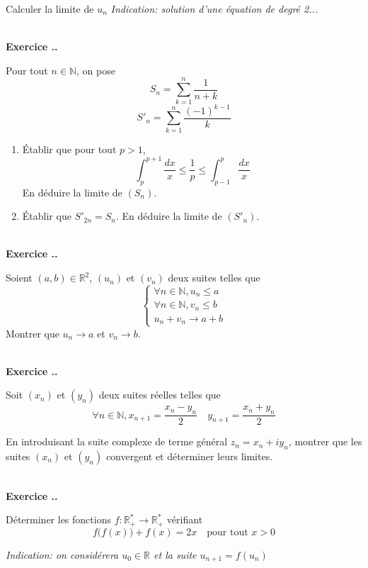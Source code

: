 \documentclass{article}
\newcommand{\mb}[1]{\mathbb{#1}}
\newcounter{exo}
\newcommand{\exercice}[1][\null]{\textbf{\\ Exercice \thesection.\theexo. #1} \addtocounter{exo}{1}}
\begin{document}
Calculer la limite de $u_n$ \emph{Indication: solution d'une équation de degré
2...}

\exercice

Pour tout $n \in \mb{N}$, on pose
\begin{equation*}
    S_{n} = \sum_{k = 1}^{n} \frac{1}{n + k}
\end{equation*}
\begin{equation*}
    S'_{n} = \sum_{k = 1}^{n} \frac{( - 1)^{k - 1}}{k}
\end{equation*}
\begin{enumerate}
    \item
    Établir que pour tout $p > 1$,
    \begin{equation*}
        \int_{p}^{p + 1} \frac{d x}{x} \leq \frac{1}{p} \leq \int_{p - 1}^{p} \frac{d x}{x}
    \end{equation*}
    En déduire la limite de $(S_{n})$.
    \item
    Établir que $S'_{2n} = S_{n}$. En déduire la limite de $(S'_{n})$.
\end{enumerate}


\exercice

Soient $(a,b) \in \mb{R}^{2}$, $(u_{n})$ et $(v_{n})$ deux suites telles que
\begin{equation*}
    \begin{cases}
        \forall n \in \mb{N}, u_n \leq a \\
        \forall n \in \mb{N}, v_n \leq b \\
        u_n + v_n \to a + b
    \end{cases}
\end{equation*}
Montrer que $u_{n} \to a$ et $v_{n} \to b$.

\exercice

Soit $(x_{n})$ et $(y_{n})$ deux suites réelles telles que
\begin{equation*}
    \forall n \in \mb{N}, x_{n + 1} = \frac{x_{n} - y_{n}}{2} \quad  y_{n + 1} = \frac{x_{n} + y_{n}}{2}
\end{equation*}

En introduisant la suite complexe de terme général $z_{n} = x_{n} + i y_{n}$, 
montrer que les suites $(x_{n})$ et $(y_{n})$ convergent et déterminer leurs limites.

\exercice

Déterminer les fonctions $f\colon \mb{R}_{ + }^{*} \to \mb{R}_{ + }^{*}$ vérifiant
\begin{equation*}
  f\bigl(f(x)\bigr) + f(x) = 2x  \quad\text{pour tout $x>0$}
\end{equation*}

\emph{Indication: on considérera $u_0 \in \mb{R}$ et la suite $u_{n+1} =
f(u_n)$}
\end{document}

